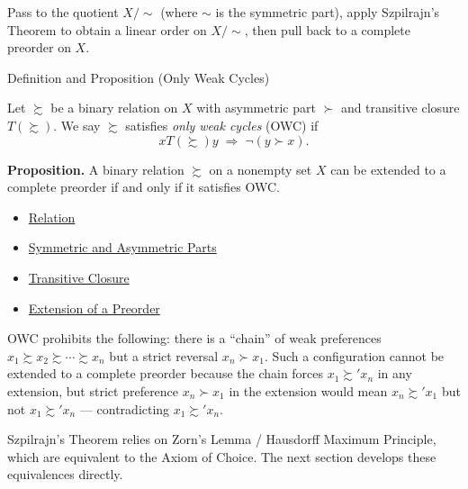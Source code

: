 \begin{remark*}[Proof]
Pass to the quotient $X/{\sim}$ (where $\sim$ is the symmetric part), apply
Szpilrajn's Theorem to obtain a linear order on $X/{\sim}$, then pull back
to a complete preorder on $X$.
\end{remark*}

\begin{definitionbox}{Definition and Proposition (Only Weak Cycles)}
\begin{definition}\label{def:owc}
Let $\succsim$ be a binary relation on $X$ with asymmetric part $\succ$ and
transitive closure $T(\succsim)$. We say $\succsim$ satisfies \emph{only weak
cycles} (OWC) if
\[
  xT(\succsim)y \;\Rightarrow\; \lnot(y \succ x).
\]

\medskip
\noindent\textbf{Proposition.} A binary relation $\succsim$ on a nonempty
set $X$ can be extended to a complete preorder if and only if it satisfies
OWC.
\end{definition}
\end{definitionbox}

\begin{dependencies}
\begin{itemize}
  \item \hyperref[def:relation]{Relation}
  \item \hyperref[def:sym-asym]{Symmetric and Asymmetric Parts}
  \item \hyperref[def:trans-closure]{Transitive Closure}
  \item \hyperref[def:preorder-extension]{Extension of a Preorder}
\end{itemize}
\end{dependencies}

\begin{remark*}
OWC prohibits the following: there is a ``chain'' of weak preferences
$x_1 \succsim x_2 \succsim \cdots \succsim x_n$ but a strict reversal
$x_n \succ x_1$. Such a configuration cannot be extended to a complete
preorder because the chain forces $x_1 \succsim' x_n$ in any extension, but
strict preference $x_n \succ x_1$ in the extension would mean
$x_n \succsim' x_1$ but not $x_1 \succsim' x_n$ — contradicting
$x_1 \succsim' x_n$.
\end{remark*}

\begin{remark*}[Transition to AC]
Szpilrajn's Theorem relies on Zorn's Lemma / Hausdorff Maximum Principle,
which are equivalent to the Axiom of Choice. The next section develops
these equivalences directly.
\end{remark*}
